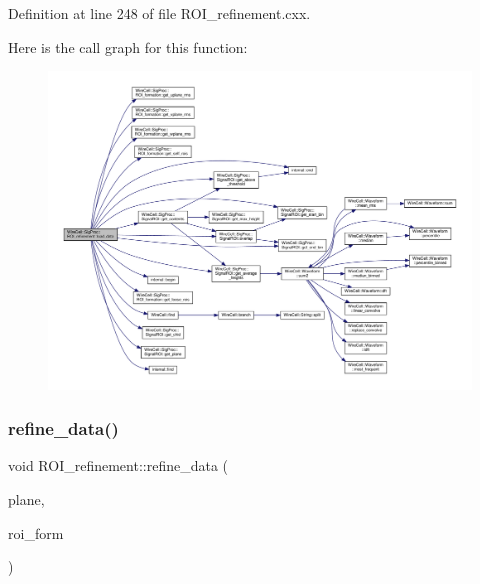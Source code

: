 Definition at line 248 of file R\+O\+I\+\_\+refinement.\+cxx.

Here is the call graph for this function\+:
\nopagebreak
\begin{figure}[H]
\begin{center}
\leavevmode
\includegraphics[width=350pt]{class_wire_cell_1_1_sig_proc_1_1_r_o_i__refinement_a2752abfaf6f0c8e84cef5dcec56010ee_cgraph}
\end{center}
\end{figure}
\mbox{\label{class_wire_cell_1_1_sig_proc_1_1_r_o_i__refinement_adf99f43f2c712c0e78597388afad65d0}} 
\subsubsection{\texorpdfstring{refine\+\_\+data()}{refine\_data()}}
{\footnotesize\ttfamily void R\+O\+I\+\_\+refinement\+::refine\+\_\+data (\begin{DoxyParamCaption}\item[{int}]{plane,  }\item[{\hyperlink{class_wire_cell_1_1_sig_proc_1_1_r_o_i__formation}{R\+O\+I\+\_\+formation} \&}]{roi\+\_\+form }\end{DoxyParamCaption})}



